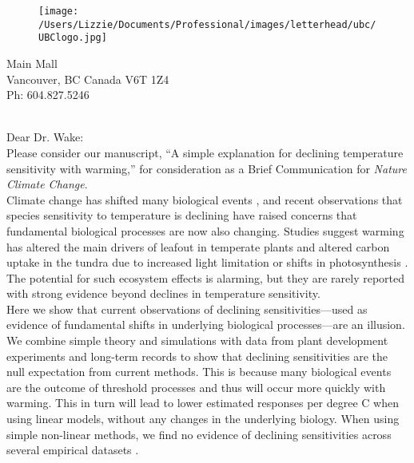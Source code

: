 \documentclass[11pt,a4paper]{article}
\begin{document}

\begin{figure}[htbp]
\hspace*{14cm}                                                           
\texttt{[image: /Users/Lizzie/Documents/Professional/images/letterhead/ubc/UBClogo.jpg]}
\end{figure}
\vspace{-10ex}
\begin{small}
 Main Mall \\
\noindent Vancouver, BC Canada V6T 1Z4\\
\noindent Ph: 604.827.5246\\
\end{small}
\vspace{2ex}\\
\noindent Dear Dr. Wake:
\vspace{1.5ex}\\
Please consider our manuscript, ``A simple explanation for declining temperature sensitivity with warming,'' for consideration as a Brief Communication for \emph{Nature Climate Change}. 
\vspace{1.5ex}\\
Climate change has shifted many biological events \citep{IPCC:2014sm}, and recent observations that species sensitivity to temperature is declining have raised concerns that fundamental biological processes are now also changing. Studies suggest warming has altered the main drivers of leafout in temperate plants \citep{fu2015,gusewell2017,Samplonius:2018aa} and altered carbon uptake in the tundra due to increased light limitation or shifts in photosynthesis \citep{piao2017,Zhu2019}. The potential for such ecosystem effects is alarming, but they are rarely reported with strong evidence beyond declines in temperature sensitivity.
\vspace{1.5ex}\\
Here we show that current observations of declining sensitivities---used as evidence of fundamental shifts in underlying biological processes---are an illusion. We combine simple theory and simulations with data from plant development experiments and long-term records to show that declining sensitivities are the null expectation from current methods. This is because many biological events are the outcome of threshold processes and thus will occur more quickly with warming. This in turn will lead to lower estimated responses per degree C when using linear models, without any changes in the underlying biology. When using simple non-linear methods, we find no evidence of declining sensitivities across several empirical datasets \citep[including using the same dataset used in][]{fu2015} . %
\end{document}
